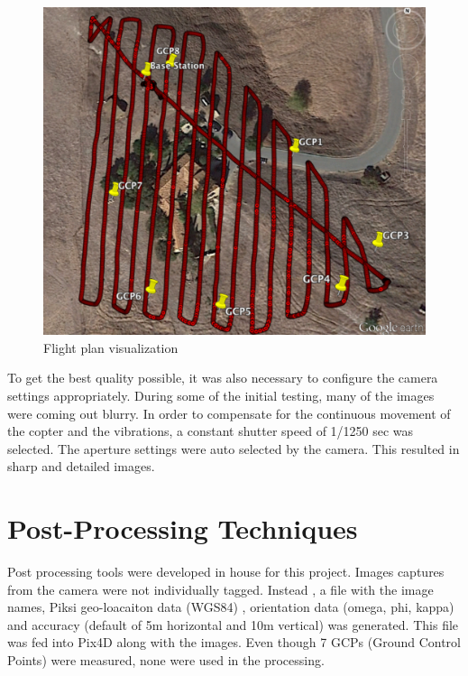 \documentclass{article}
\begin{document}
\begin{figure}
\begin{center}
\includegraphics[width=5in]{images/flight_plan_gcp.png}
\caption{Flight plan visualization}
\label{flightplan}
\end{center}
\end{figure}

To get the best quality possible, it was also necessary to configure the camera settings appropriately. During some of the initial testing, many of the images were coming out blurry. In order to compensate for the continuous movement of the copter and the vibrations, a constant shutter speed of 1/1250 sec was selected. The aperture settings were auto selected by the camera. This resulted in sharp and detailed images.

\section{Post-Processing Techniques}
\label{sec:postprocessing}
Post processing tools were developed in house for this project. Images captures from the camera were not individually tagged. Instead , a file with the image names, Piksi geo-loacaiton data (WGS84) , orientation data (omega, phi, kappa) and accuracy (default of 5m horizontal and 10m vertical) was generated. This file was fed into Pix4D along with the images. Even though 7 GCPs (Ground Control Points) were measured, none were used in the processing.
\end{document}
